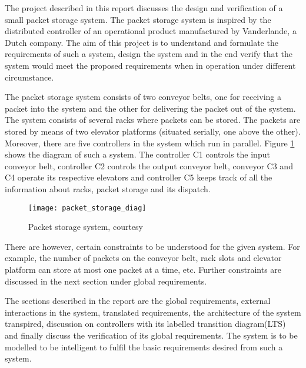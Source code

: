 
The project described in this report discusses the design and verification of a small packet storage system. The packet storage system is inspired by the distributed controller of an operational product manufactured by Vanderlande, a Dutch company. 
The aim of this project is to understand and formulate the requirements of such a system, design the system and in the end verify that the system would meet the proposed requirements when in operation under different circumstance.

The packet storage system consists of two conveyor belts, one for receiving a packet into the system and the other for delivering the packet out of the system. The system consists of several racks where packets can be stored. The packets are stored by means of two elevator platforms (situated serially, one above the other). Moreover, there are five controllers in the system which run in parallel. Figure \ref{fig:packet_storage} shows the diagram of such a system. The controller C1 controls the input conveyor belt, controller C2 controls the output conveyor belt, conveyor C3 and C4 operate its respective elevators and controller C5 keeps track of all the information about racks, packet storage and its dispatch.

\begin{figure}[h]
\center
\texttt{[image: packet\_storage\_diag]}
\caption{Packet storage system, courtesy \cite{problem_statement}}
\label{fig:packet_storage}
\end{figure}

There are however, certain constraints to be understood for the given system. For example, the number of packets on the conveyor belt, rack slots and elevator platform can store at most one packet at a time, etc. Further constraints are discussed in the next section under global requirements.

The sections described in the report are the global requirements, external interactions in the system, translated requirements, the architecture of the system transpired, discussion on controllers with its labelled transition diagram(LTS) and finally discuss the verification of its global requirements.
The system is to be modelled to be intelligent to fulfil the basic requirements desired from such a system.